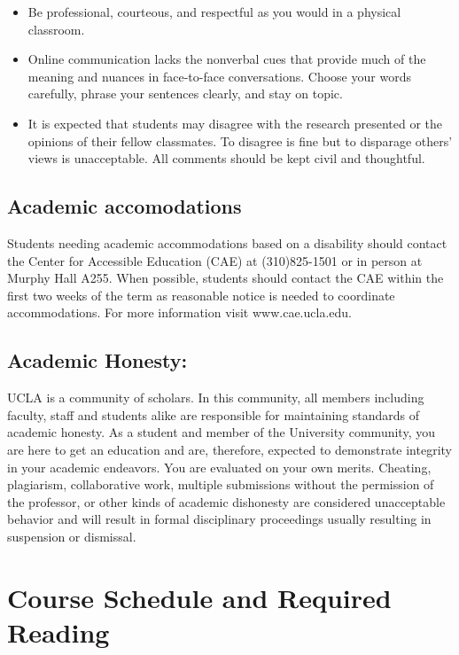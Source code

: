 \documentclass[11pt,]{article}
\providecommand{\tightlist}{%
  \setlength{\itemsep}{0pt}\setlength{\parskip}{0pt}}
\begin{document}
\begin{itemize}
\tightlist
\item
  Be professional, courteous, and respectful as you would in a physical
  classroom.
\item
  Online communication lacks the nonverbal cues that provide much of the
  meaning and nuances in face-to-face conversations. Choose your words
  carefully, phrase your sentences clearly, and stay on topic.
\item
  It is expected that students may disagree with the research presented
  or the opinions of their fellow classmates. To disagree is fine but to
  disparage others' views is unacceptable. All comments should be kept
  civil and thoughtful.
\end{itemize}

\subsection{Academic accomodations}\label{academic-accomodations}

Students needing academic accommodations based on a disability should
contact the Center for Accessible Education (CAE) at (310)825-1501 or in
person at Murphy Hall A255. When possible, students should contact the
CAE within the first two weeks of the term as reasonable notice is
needed to coordinate accommodations. For more information visit
www.cae.ucla.edu.

\subsection{Academic Honesty:}\label{academic-honesty}

UCLA is a community of scholars. In this community, all members
including faculty, staff and students alike are responsible for
maintaining standards of academic honesty. As a student and member of
the University community, you are here to get an education and are,
therefore, expected to demonstrate integrity in your academic endeavors.
You are evaluated on your own merits. Cheating, plagiarism,
collaborative work, multiple submissions without the permission of the
professor, or other kinds of academic dishonesty are considered
unacceptable behavior and will result in formal disciplinary proceedings
usually resulting in suspension or dismissal.

\section{Course Schedule and Required
Reading}\label{course-schedule-and-required-reading}
\end{document}
